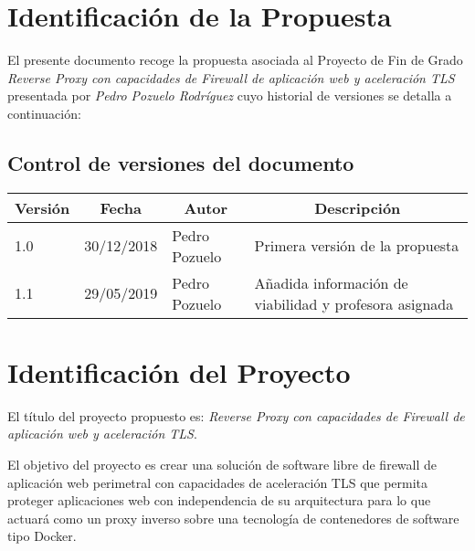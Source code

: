 
\newcommand{\autor}{Pedro Pozuelo Rodríguez}
\newcommand{\titulo}{Reverse Proxy con capacidades de Firewall de aplicación web y aceleración TLS}
\newcommand{\profesor}{Ana del Valle Corrales Paredes}
\newcommand{\PFGID}{Pendiente}
\newcommand{\fechaversion}{30 de diciembre de 2018}

\newcommand{\pfg}[1]{\par \textbf{{\color{blue} GUIDE: }{#1}}}
\newcommand{\wip}{\par {\color{red} WIP}}


% 



\makeglossaries






\clearpage
\section{Identificación de la Propuesta}
El presente documento recoge la propuesta asociada al Proyecto de Fin de Grado {\em \titulo} presentada por
{\em \autor} cuyo historial de versiones se detalla a continuación:
\subsection{Control de versiones del documento}
\begin{center}
  \begin{tabularx}{0.9\textwidth} {llll}
		\multicolumn{1}{c}{\textbf{Versión}} &
		\multicolumn{1}{c}{\textbf{Fecha}} &
		\multicolumn{1}{c}{\textbf{Autor}} &
		\multicolumn{1}{c}{\textbf{Descripción}}\\
		\hline
    1.0 & 30/12/2018  & Pedro Pozuelo & Primera versión de la propuesta \\
    1.1 & 29/05/2019  & Pedro Pozuelo & Añadida información de viabilidad y profesora asignada\\
  \end{tabularx}
\end{center}


\section{Identificación del Proyecto}
\par El título del proyecto propuesto es: {\em \titulo}.
\par El objetivo del proyecto es crear una solución de software libre de firewall de aplicación web perimetral con
capacidades de aceleración TLS que permita proteger aplicaciones web con in\-de\-pen\-den\-cia de su arquitectura
para lo que actuará como un proxy inverso sobre una tecnología de contenedores de software tipo Docker.


